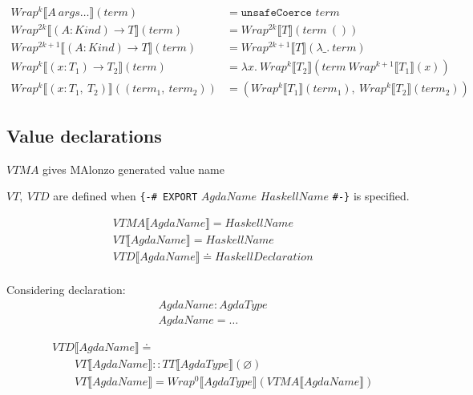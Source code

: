 \begin{align*}
   Wrap^k\llbracket A\ args\ldots \rrbracket(term) &= \texttt{unsafeCoerce } term\\
   Wrap^{2k}\llbracket (A : Kind) \rightarrow T \rrbracket(term) &= Wrap^{2k}\llbracket T \rrbracket(term\ ())\\
   Wrap^{2k+1}\llbracket (A : Kind) \rightarrow T \rrbracket(term) &= Wrap^{2k+1}\llbracket T \rrbracket(\lambda \_.\ term)\\
   Wrap^k\llbracket (x : T_1) \rightarrow T_2 \rrbracket(term) &=
      \lambda x.\ Wrap^k\llbracket T_2 \rrbracket(term\ Wrap^{k+1}\llbracket T_1 \rrbracket(x))\\
   Wrap^k\llbracket (x : T_1,\ T_2) \rrbracket((term_1,\ term_2)) &=
      (Wrap^k\llbracket T_1 \rrbracket(term_1),\ Wrap^k\llbracket T_2 \rrbracket(term_2))
\end{align*}

\subsection{Value declarations}

\(VTMA\) gives MAlonzo generated value name

\(VT,\ VTD\) are defined when \texttt{\{-\# EXPORT} \(AgdaName\) \(HaskellName\) \texttt{\#-\}} is specified.

\begin{align*}
   &VTMA\llbracket AgdaName \rrbracket = HaskellName\\
   &VT\llbracket AgdaName \rrbracket = HaskellName\\
   &VTD\llbracket AgdaName \rrbracket \doteq HaskellDeclaration\\
\end{align*}

Considering declaration:
\begin{align*}
   &AgdaName : AgdaType\\
   &AgdaName = \ldots
\end{align*}

\begin{align*}
   &VTD\llbracket AgdaName \rrbracket \doteq\\
   &\quad\quad VT\llbracket AgdaName \rrbracket :: TT\llbracket AgdaType \rrbracket(\varnothing)\\
   &\quad\quad VT\llbracket AgdaName \rrbracket = Wrap^0\llbracket AgdaType \rrbracket(VTMA\llbracket AgdaName \rrbracket)\\
\end{align*}

